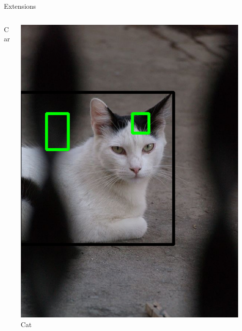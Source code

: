 \documentclass[compress,aspectratio=43]{beamer}
\begin{document}
\begin{frame}{Extensions}
{\begin{columns}
\begin{column}{0.3\textwidth}
    		{\scriptsize Car}
		\end{column}
		\begin{column}{0.3\textwidth}
		    \hspace{2mm}
    		\centering
    		\includegraphics[width=1\linewidth]{figures/sgd/cat.png} \\
    		{\scriptsize Cat}
		\end{column}
		\begin{column}{0.3\textwidth}
    		\hspace{2mm}
    		\centering

\end{column}
\end{columns}}
\end{frame}
\end{document}
